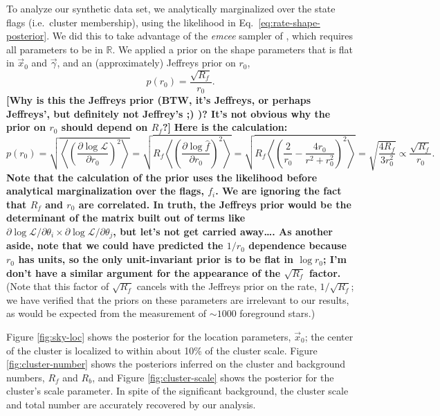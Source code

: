 \documentclass[aps,prd]{revtex4-1}
\newcommand{\ilya}[1]{{\color{red} \bf #1}}
\newcommand{\will}[1]{{\color{blue} \bf #1}}
\begin{document}
To analyze our synthetic data set, we analytically marginalized over
the state flags (i.e.~cluster membership), using the likelihood in
Eq.~\eqref{eq:rate-shape-posterior}.  We did this to take advantage of
the \textit{emcee} sampler of \citet{ForemanMackey2012}, which
requires all parameters to be in $\mathbb{R}$.  We applied a prior on
the shape parameters that is flat in $\vec{x}_0$ and $\vec{\gamma}$,
and an (approximately) Jeffreys prior on $r_0$,
\begin{equation}
  p\left( r_0 \right) = \frac{\sqrt{R_f}}{r_0}.
\end{equation}
\ilya{[Why is this the Jeffreys prior (BTW, it's Jeffreys, or perhaps
    Jeffreys', but definitely not Jeffrey's ;) )?  It's not obvious
    why the prior on $r_0$ should depend on $R_f$?]}  \will{Here is
  the calculation:
\begin{equation}
  p\left( r_0 \right) = \sqrt{\left\langle \left(\frac{\partial \log
      \mathcal{L}}{\partial r_0 } \right)^2 \right\rangle} = \sqrt{
    R_f \left\langle \left(\frac{\partial \log\hat{f}}{\partial r_0
    }\right)^2 \right\rangle } = \sqrt{R_f \left\langle \left(
    \frac{2}{r_0} - \frac{4 r_0}{r^2 + r_0^2} \right)^2 \right\rangle}
  = \sqrt{\frac{ 4 R_f}{3 r_0^2}} \propto \frac{\sqrt{R_f}}{r_0}.
\end{equation}
Note that the calculation of the prior uses the likelihood before
analytical marginalization over the flags, $f_i$.  We are ignoring the
fact that $R_f$ and $r_0$ are correlated.  In truth, the Jeffreys
prior would be the determinant of the matrix built out of terms like
$\partial \log\mathcal{L} / \partial \theta_i \times \partial
\log\mathcal{L} /\partial \theta_j$, but let's not get carried
away\ldots.  As another aside, note that we could have predicted the
$1/r_0$ dependence because $r_0$ has units, so the only unit-invariant
prior is to be flat in $\log r_0$; I'm don't have a similar argument
for the appearance of the $\sqrt{R_f}$ factor.}  (Note that this
factor of $\sqrt{R_f}$ cancels with the Jeffreys prior on the rate,
$1/\sqrt{R_f}$; we have verified that the priors on these parameters
are irrelevant to our results, as would be expected from the
measurement of $\sim 1000$ foreground stars.)

Figure \ref{fig:sky-loc} shows the posterior for the location
parameters, $\vec{x}_0$; the center of the cluster is localized to
within about 10\% of the cluster scale.  Figure
\ref{fig:cluster-number} shows the posteriors inferred on the cluster
and background numbers, $R_f$ and $R_b$, and Figure
\ref{fig:cluster-scale} shows the posterior for the cluster's scale
parameter.  In spite of the significant background, the cluster scale
and total number are accurately recovered by our analysis.
\end{document}
